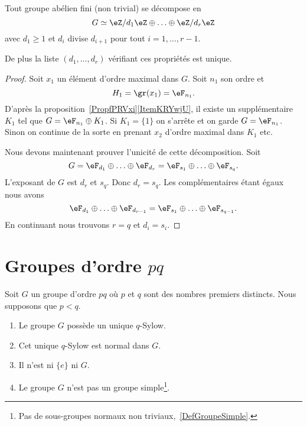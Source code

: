 \begin{theorem} \label{ThoRJWVJd}
	Tout groupe abélien fini (non trivial) se décompose en
	\begin{equation}
		G\simeq \eZ/d_1\eZ\oplus\ldots\oplus \eZ/d_r\eZ
	\end{equation}
	avec \( d_1\geq 1\) et \( d_i\) divise \( d_{i+1}\) pour tout \( i=1,\ldots, r-1\).

	De plus la liste \( (d_1,\ldots, d_r)\) vérifiant ces propriétés est unique.
\end{theorem}

\begin{proof}
	Soit \( x_1\) un élément d'ordre maximal dans \( G\). Soit \( n_1\) son ordre et
	\begin{equation}
		H_1=\gr(x_1)=\eF_{n_1}.
	\end{equation}
	D'après la proposition~\ref{PropfPRVxi}\ref{ItemKRYwjU}, il existe un supplémentaire \( K_1\) tel que \( G=\eF_{n_1}\oplus K_1\). Si \( K_1=\{ 1 \}\) on s'arrête et on garde \( G=\eF_{n_1}\). Sinon on continue de la sorte en prenant \( x_2\) d'ordre maximal dans \( K_1\) etc.

	Nous devons maintenant prouver l'unicité de cette décomposition. Soit
	\begin{equation}
		G=\eF_{d_1}\oplus\ldots\oplus \eF_{d_r}=\eF_{s_1}\oplus\ldots\oplus \eF_{s_q}.
	\end{equation}
	L'exposant de \( G\) est \( d_r\) et \( s_q\). Donc \( d_r=s_q\). Les complémentaires étant égaux nous avons
	\begin{equation}
		\eF_{d_1}\oplus\ldots\oplus \eF_{d_{r-1}}=\eF_{s_1}\oplus\ldots\oplus \eF_{s_{q-1}}.
	\end{equation}
	En continuant nous trouvons \( r=q\) et \( d_i=s_i\).
\end{proof}

\section{Groupes d'ordre \texorpdfstring{$ pq$}{pq}}

\begin{lemma}
	Soit \( G\) un groupe d'ordre \( pq\) où \( p\) et \( q\) sont des nombres premiers distincts. Nous supposons que \( p<q\).
	\begin{enumerate}
		\item
		      Le groupe \( G\) possède un unique \( q\)-Sylow.
		\item
		      Cet unique \( q\)-Sylow est normal dans \( G\).
		\item
		      Il n'est ni \( \{ e \}\) ni \( G\).
		\item
		      Le groupe \( G\) n'est pas un groupe simple\footnote{Pas de sous-groupes normaux non triviaux,~\ref{DefGroupeSimple}.}.
	\end{enumerate}
\end{lemma}

